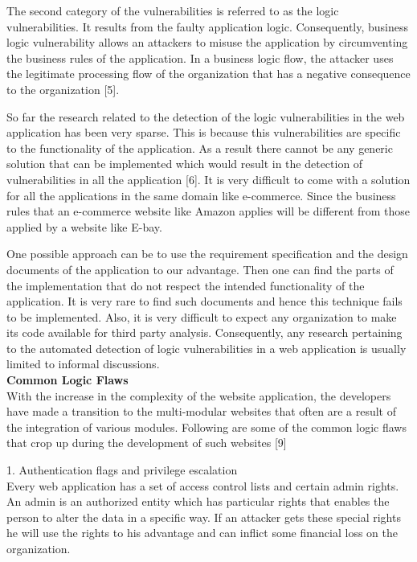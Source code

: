 \documentclass[11pt]{article}
\begin{document}
 The second category of the vulnerabilities is referred to as the logic vulnerabilities. It results from the faulty application logic. Consequently, business logic vulnerability allows an attackers to misuse the application by circumventing the business rules of the application. In a business logic flow, the attacker uses the legitimate processing flow of the organization that has a negative consequence to the organization [5]. 
 
 So far the research related to the detection of the logic vulnerabilities in the web application has been very sparse. This is because this vulnerabilities are specific to the functionality of the application. As a result there cannot be any generic solution that can be implemented which would result in the detection of vulnerabilities in all the application [6]. It is very difficult to come with a solution for all the applications in the same domain like e-commerce. Since the business rules that an e-commerce website like Amazon applies will be different from those applied by a website like E-bay.
 
 One possible approach can be to use the requirement specification and the design documents of the application  to our advantage. Then one can find the parts of the implementation that do not respect the intended functionality of the application. It is very rare to find such documents and hence this technique fails to be implemented. Also, it is very difficult to expect any organization to make its code available for third  party analysis. Consequently, any research pertaining to the automated detection of logic vulnerabilities in a web application is usually limited to informal discussions. \\

\textbf{Common Logic Flaws}\\
With the increase in the complexity of the website application, the developers have made a transition to the multi-modular websites that often are a result of the integration of various modules. Following are some of the common logic flaws that crop up during the development of such websites [9]


 1. Authentication flags and privilege escalation \\
Every web application has a set of access control lists and certain admin rights. An admin is an authorized entity which has particular rights that enables the person to alter the data in a specific way. If an attacker gets these special rights he will use the rights to his advantage and can inflict some financial loss on the organization.
\end{document}

